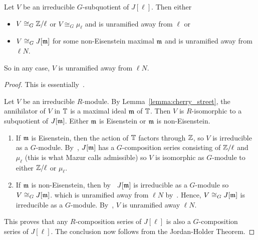 \documentclass{article}
\begin{document}
\begin{theorem}\label{theorem:irreducible_G_sub}
    Let $V$ be an irreducible $G$-subquotient of $J[\ell]$. Then either
    \begin{itemize}
        \item
            $V\cong_G \mathbb{Z}/\ell$ or $V\cong_G \mu_\ell$ and is unramified away
            from $\ell$ or
        \item 
            $V\cong_G J[\mathfrak{m}]$ for some non-Eisenstein maximal $\mathfrak{m}$ and is
            unramified away from $\ell N$.
    \end{itemize}
    So in any case, $V$ is unramified away from $\ell N$.
\end{theorem}
\begin{proof}
    This is essentially~\cite[\S 14]{mazur:eisenstein}. 

    Let $V$ be an irreducible $R$-module. By Lemma~\ref{lemma:cherry_street},
    the annihilator of $V$ in $\mathbb{T}$ is a maximal ideal $\mathfrak{m}$ of $\mathbb{T}$. Then $V$
    is $R$-isomorphic to a subquotient of $J[\mathfrak{m}]$. Either $\mathfrak{m}$ is Eisenstein or
    $\mathfrak{m}$ is non-Eisenstein.
    \begin{enumerate}
        \item
            If $\mathfrak{m}$ is Eisenstein, then the action of $\mathbb{T}$ factors through
            $\mathbb{Z}$, so $V$ is irreducible as a $G$-module. By~\cite[Proposition
            14.1]{mazur:eisenstein}, $J[\mathfrak{m}]$ has a $G$-composition series
            consisting of $\mathbb{Z}/\ell$ and $\mu_\ell$ (this is what Mazur calls
            admissible) so $V$ is isomorphic as $G$-module to either $\mathbb{Z}/\ell$
            or $\mu_\ell$.
        \item
            If $\mathfrak{m}$ is non-Eisenstein, then by~\cite[Proposition
            14.2]{mazur:eisenstein} $J[\mathfrak{m}]$ is irreducible as a $G$-module so
            $V\cong_G J[\mathfrak{m}]$. which is unramified away from $\ell N$
            by~\cite[Theorem 6.7]{deligne-serre}. Hence, $V\cong_G J[\mathfrak{m}]$ is
            irreducible as a $G$-module. By~\cite[Theorem 6.7]{deligne-serre},
            $V$ is unramified away $\ell N$.
    \end{enumerate}
    This proves that any $R$-composition series of $J[\ell]$ is also a
    $G$-composition series of $J[\ell]$. The conclusion now follows from the
    Jordan-Holder Theorem.
\end{proof} 
\end{document}
